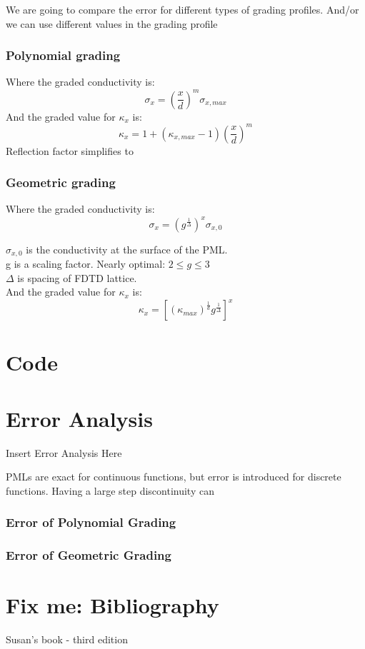 \documentclass{article}
\begin{document}
We are going to compare the error for different types of grading profiles.
And/or we can use different values in the grading profile 

\subsubsection{Polynomial grading}
Where the graded conductivity is:
\[\sigma_{x} = (\frac{x}{d})^{m} \sigma_{x,max}\]
And the graded value for $\kappa_{x}$ is:
\[\kappa_{x}=1+(\kappa_{x,max}-1)(\frac{x}{d})^{m}\]
Reflection factor simplifies to 

\subsubsection{Geometric grading}
Where the graded conductivity is:
\[\sigma_{x} =(g^{\frac{1}{\Delta}})^{x} \sigma_{x,0}\]

$\sigma_{x,0}$ is the conductivity at the surface of the PML.\\
g is a scaling factor. Nearly optimal: $2 \leq g \leq 3$\\
$\Delta$ is spacing of FDTD lattice.\\

And the graded value for $\kappa_{x}$ is:
\[\kappa_{x}=[(\kappa_{max})^{\frac{1}{d}}g^{\frac{1}{\Delta}}]^{x}\]

\section{Code}


\section{Error Analysis}
Insert Error Analysis Here

PMLs are exact for continuous functions, but error is introduced for discrete
functions. Having a large step discontinuity can

\subsubsection{Error of Polynomial Grading}

\subsubsection{Error of Geometric Grading}

\section{Fix me: Bibliography}
Susan's book - third edition
\end{document}
